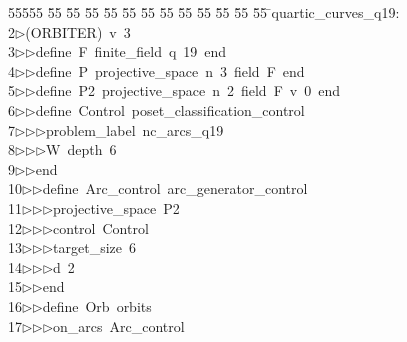 %
%
\begin{tabbing}
55555 \= 55 \= 55 \= 55 \= 55 \= 55 \= 55 \= 55 \= 55 \= 55 \= 55 \= 55 \= 55 \= \>quartic\_curves\_q19:\\[0pt]
2\>$\triangleright$\>(ORBITER)\ v\ 3\ \\[0pt]
3\>$\triangleright$\>$\triangleright$\>define\ F\ finite\_field\ q\ 19\ end\ \\[0pt]
4\>$\triangleright$\>$\triangleright$\>define\ P\ projective\_space\ n\ 3\ field\ F\ end\ \\[0pt]
5\>$\triangleright$\>$\triangleright$\>define\ P2\ projective\_space\ n\ 2\ field\ F\ v\ 0\ end\ \\[0pt]
6\>$\triangleright$\>$\triangleright$\>define\ Control\ poset\_classification\_control\ \\[0pt]
7\>$\triangleright$\>$\triangleright$\>$\triangleright$\>problem\_label\ nc\_arcs\_q19\ \\[0pt]
8\>$\triangleright$\>$\triangleright$\>$\triangleright$\>W\ depth\ 6\ \\[0pt]
9\>$\triangleright$\>$\triangleright$\>end\ \\[0pt]
10\>$\triangleright$\>$\triangleright$\>define\ Arc\_control\ arc\_generator\_control\ \\[0pt]
11\>$\triangleright$\>$\triangleright$\>$\triangleright$\>projective\_space\ P2\ \\[0pt]
12\>$\triangleright$\>$\triangleright$\>$\triangleright$\>control\ Control\ \\[0pt]
13\>$\triangleright$\>$\triangleright$\>$\triangleright$\>target\_size\ 6\ \\[0pt]
14\>$\triangleright$\>$\triangleright$\>$\triangleright$\>d\ 2\ \\[0pt]
15\>$\triangleright$\>$\triangleright$\>end\ \\[0pt]
16\>$\triangleright$\>$\triangleright$\>define\ Orb\ orbits\ \\[0pt]
17\>$\triangleright$\>$\triangleright$\>$\triangleright$\>on\_arcs\ Arc\_control\ \\[0pt]

\end{tabbing}
